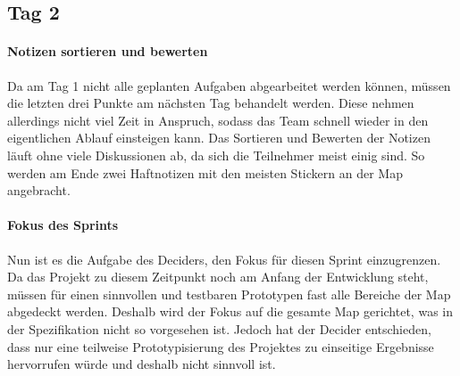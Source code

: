 \subsection*{\label{sec:Sprint-Umsetzung-Tag2}\thesubsection\quad Tag 2}
\paragraph{Notizen sortieren und bewerten}
Da am Tag 1 nicht alle geplanten Aufgaben abgearbeitet werden können, müssen die letzten drei Punkte am nächsten Tag behandelt werden. Diese nehmen allerdings nicht viel Zeit in Anspruch, sodass das Team schnell wieder in den eigentlichen Ablauf einsteigen kann. Das Sortieren und Bewerten der Notizen läuft ohne viele Diskussionen ab, da sich die Teilnehmer meist einig sind. So werden am Ende zwei Haftnotizen mit den meisten Stickern an der Map angebracht.


\paragraph{Fokus des Sprints}
Nun ist es die Aufgabe des Deciders, den Fokus für diesen Sprint einzugrenzen. Da das Projekt zu diesem Zeitpunkt noch am Anfang der Entwicklung steht, müssen für einen sinnvollen und testbaren Prototypen fast alle Bereiche der Map abgedeckt werden. Deshalb wird der Fokus auf die gesamte Map gerichtet, was in der Spezifikation nicht so vorgesehen ist. Jedoch hat der Decider entschieden, dass nur eine teilweise Prototypisierung des Projektes zu einseitige Ergebnisse hervorrufen würde und deshalb nicht sinnvoll ist.

